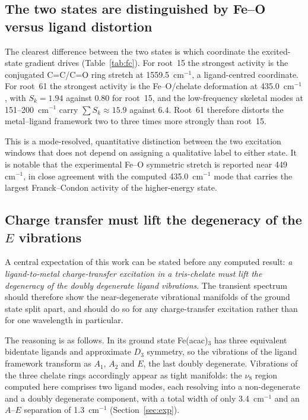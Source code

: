 \documentclass[11pt,a4paper]{article}
\newcommand{\wn}{\ensuremath{\mathrm{cm^{-1}}}}
\begin{document}
\subsection{The two states are distinguished by Fe--O versus ligand distortion}

The clearest difference between the two states is which coordinate the
excited-state gradient drives (Table~\ref{tab:fc}). For root~15 the strongest
activity is the conjugated C=C/C=O ring stretch at 1559.5~\wn{}, a
ligand-centred coordinate. For root~61 the strongest activity is the
Fe--O/chelate deformation at 435.0~\wn{}, with $S_k = 1.94$ against $0.80$ for
root~15, and the low-frequency skeletal modes at 151--200~\wn{} carry
$\sum S_k \approx 15.9$ against $6.4$. Root~61 therefore distorts the
metal--ligand framework two to three times more strongly than root~15.

This is a mode-resolved, quantitative distinction between the two excitation
windows that does not depend on assigning a qualitative label to either state.
It is notable that the experimental Fe--O symmetric stretch is reported near
449~\wn{}, in close agreement with the computed 435.0~\wn{} mode that carries
the largest Franck--Condon activity of the higher-energy state.

\subsection{Charge transfer must lift the degeneracy of the $E$ vibrations}

A central expectation of this work can be stated before any computed result:
\emph{a ligand-to-metal charge-transfer excitation in a tris-chelate must lift
the degeneracy of the doubly degenerate ligand vibrations}. The transient
spectrum should therefore show the near-degenerate vibrational manifolds of the
ground state split apart, and should do so for any charge-transfer excitation
rather than for one wavelength in particular.

The reasoning is as follows. In its ground state Fe(acac)$_3$ has three
equivalent bidentate ligands and approximate $D_3$ symmetry, so the vibrations
of the ligand framework transform as $A_1$, $A_2$ and $E$, the last doubly
degenerate. Vibrations of the three chelate rings accordingly appear as tight
manifolds: the $\nu_8$ region computed here comprises two ligand modes, each
resolving into a non-degenerate and a doubly degenerate component, with a total
width of only 3.4~\wn{} and an $A$--$E$ separation of 1.3~\wn{}
(Section~\ref{sec:exp}).
\end{document}
